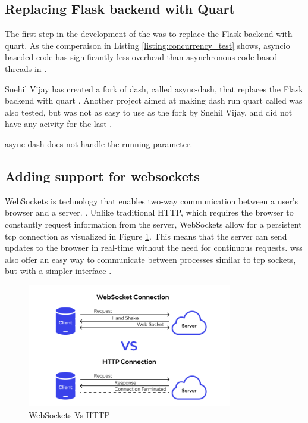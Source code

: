 \subsection{Replacing Flask backend with Quart}
The first step in the development of the \guif was to replace the Flask backend with \gls{quart}.
As the comperaison in Listing \ref{listing:concurrency_test} shows, \gls{asyncio} baseded code has significantly less overhead than asynchronous code based threads in \py.


Snehil Vijay has created a fork of \gls{dash}, called \gls{async-dash}, that replaces the Flask backend with \gls{quart} \cite{vijaySnehilvjAsyncdash2023}.
Another project aimed at making \gls{dash} run \gls{quart} called  was also tested, but was not as easy to use as the fork by Snehil Vijay, and did not have any acivity for the last  \cite{legrandCodeFrequencyRichlegrand}.

\todo \gls{async-dash} does not handle the running parameter.

\subsection{Adding support for websockets}
WebSockets is technology that enables two-way communication between a user's browser and a server.
\cite{farhutsWebSocketsBeginnersPart2019}.
Unlike traditional HTTP, which requires the browser to constantly request information from the server, WebSockets allow for a persistent \gls{tcp} connection as visualized in Figure \ref{fig:websockets_vs_http}\cite{tingUnderstandingWebSocketsIts2020}.
This means that the server can send updates to the browser in real-time without the need for continuous requests.
\glspl{ws} also offer an easy way to communicate between processes similar to \gls{tcp} sockets, but with a simpler interface \cite{kanakaAnswerDifferencesTCP2013}.
\begin{figure}[H]
    \centering
    \includegraphics[width=0.8\textwidth]{figures/gui/http_vs_ws.png}
    \caption{WebSockets Vs HTTP \cite{wallarmWebSocketVsHTTP}}
    \label{fig:websockets_vs_http}
\end{figure}


